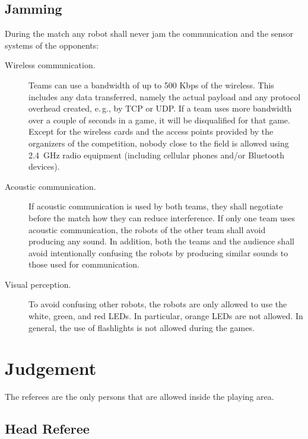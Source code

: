 \documentclass[12pt]{article}
\newcommand{\eg}{\mbox{e.\,g.}\xspace}
\begin{document}
\subsection{Jamming}

During the match any robot shall never jam the communication and the
sensor systems of the opponents:

\begin{description}

\item[Wireless communication.] Teams can use a bandwidth of up to 500 Kbps
of the wireless. This includes any data transferred, namely the actual
payload and any protocol overhead created, \eg, by TCP or UDP. If a team
uses more bandwidth over a couple of seconds in a game, it will be disqualified for that game.
Except for the wireless cards and the access points provided by the
organizers of the competition, nobody close to the field is allowed
using 2.4~GHz radio equipment (including cellular phones and/or
Bluetooth devices).
\item[Acoustic communication.] If acoustic communication is used by both
teams, they shall negotiate before the match
how they can reduce interference. If only one team uses acoustic
communication, the robots of the other team shall avoid producing
any sound. In addition, both the teams and the audience shall avoid
intentionally confusing the robots by producing similar sounds to
those used for communication.
\item[Visual perception.] To avoid confusing other robots, the robots are
only allowed to use the white, green, and red LEDs. In particular, orange LEDs
are not allowed. In general, the use of flashlights is not allowed
during the games.
\end{description}

\section{Judgement}

The referees are the only persons that are allowed inside the
playing area.

\subsection{Head Referee}
\end{document}
